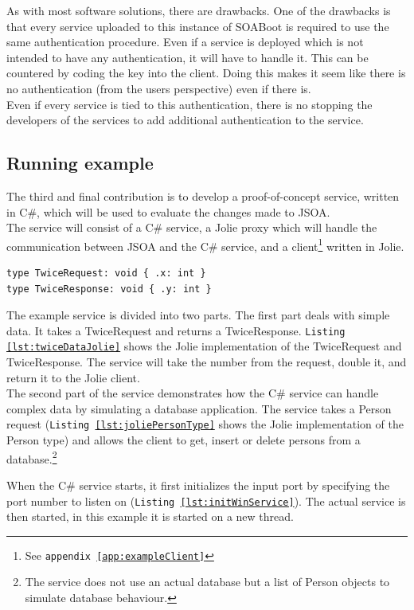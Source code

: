 \documentclass[12pt,a4paper]{article}
\begin{document}
As with most software solutions, there are drawbacks. One of the drawbacks is that every service uploaded to this instance of SOABoot is required to use the same authentication procedure. Even if a service is deployed which is not intended to have any authentication, it will have to handle it. This can be countered by coding the key into the client. Doing this makes it seem like there is no authentication (from the users perspective) even if there is.\\
Even if every service is tied to this authentication, there is no stopping the developers of the services to add additional authentication to the service.

\subsection{Running example}\label{subsec:RunningExample}
The third and final contribution is to develop a proof-of-concept service, written in C\#, which will be used to evaluate the changes made to JSOA.\\
The service will consist of a C\# service, a Jolie proxy which will handle the communication between JSOA and the C\# service, and a client\footnote{See \texttt{appendix \ref{app:exampleClient}}} written in Jolie.

\begin{lstlisting}[caption={TwiceRequest and TwiceResponse in Jolie},label={lst:twiceDataJolie}]
type TwiceRequest: void { .x: int }
type TwiceResponse: void { .y: int }
\end{lstlisting}

The example service is divided into two parts. The first part deals with simple data. It takes a TwiceRequest and returns a TwiceResponse. \texttt{Listing \ref{lst:twiceDataJolie}} shows the Jolie implementation of the TwiceRequest and TwiceResponse. The service will take the number from the request, double it, and return it to the Jolie client.\\

The second part of the service demonstrates how the C\# service can handle complex data by simulating a database application. The service takes a Person request (\texttt{Listing \ref{lst:joliePersonType}} shows the Jolie implementation of the Person type) and allows the client to get, insert or delete persons from a database.\footnote{The service does not use an actual database but a list of Person objects to simulate database behaviour.}

When the C\# service starts, it first initializes the input port by specifying the port number to listen on (\texttt{Listing \ref{lst:initWinService}}). The actual service is then started, in this example it is started on a new thread.
\end{document}
